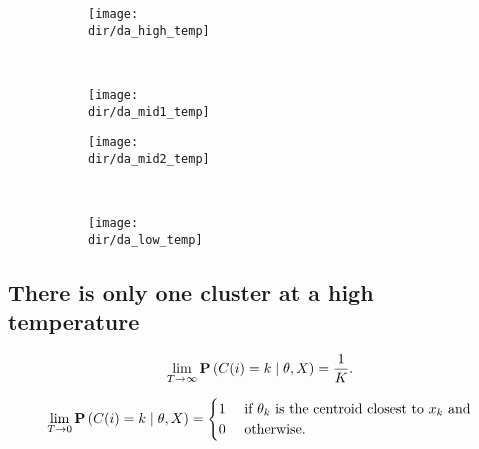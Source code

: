 \begin{figure}
    \centering
    \begin{subfigure}[b]{0.4\textwidth}
        \texttt{[image: \\dir/da\_high\_temp]}
        \caption{}
        \label{fig:da_high_temp}
    \end{subfigure}
    ~ %
    \begin{subfigure}[b]{0.4\textwidth}
        \texttt{[image: \\dir/da\_mid1\_temp]}
        \caption{}
        \label{fig:da_mid1_temp}
    \end{subfigure}
    
    \begin{subfigure}[b]{0.4\textwidth}
        \texttt{[image: \\dir/da\_mid2\_temp]}
        \caption{}
        \label{fig:da_mid2_temp}
    \end{subfigure}
    ~ %
    \begin{subfigure}[b]{0.4\textwidth}
        \texttt{[image: \\dir/da\_low\_temp]}
        \caption{}
        \label{fig:da_low_temp}
    \end{subfigure}
    \caption{}\label{fig:da_phase_trans}
\end{figure}

\subsection{There is only one cluster at a high temperature}

\begin{lemma}
\begin{equation}
\lim_{T \to \infty} \mathbf{P}\left(C(i) = k \mid \theta, X\right) = \frac{1}{K}.
\end{equation}

\begin{equation}
\lim_{T \to 0} \mathbf{P}\left(C(i) = k \mid \theta, X\right) = \begin{cases}
1 & \text{ if $\theta_k$ is the centroid closest to $x_k$ and}\\
0 & \text{ otherwise}.
\end{cases}
\end{equation}
\label{lem:da_extreme_temps}
\end{lemma}

